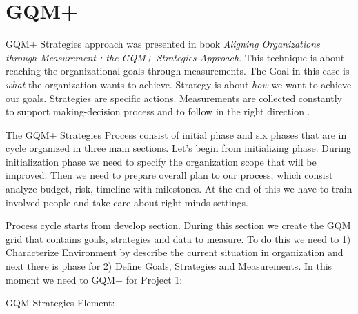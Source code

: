 \section{GQM+}

GQM+ Strategies approach was presented in  book \textit{Aligning Organizations through Measurement : the GQM+ Strategies Approach}. This technique is about reaching the organizational goals through measurements. The Goal in this case is \textit{what} the organization wants to achieve. Strategy is about \textit{how} we want to achieve our goals. Strategies are specific actions. Measurements are collected constantly to support making-decision process and to follow in the right direction \cite{basili}.

The GQM+ Strategies  Process consist of initial phase and six phases that are in cycle organized in three main sections. Let's begin from initializing phase. During initialization phase we need to specify the organization scope that will be improved. Then we need to prepare overall plan to our process, which consist analyze budget, risk, timeline with milestones. At the end of this we have to train involved people and take care about right minds settings.

Process cycle starts from develop section. During this section we create the GQM grid that contains goals, strategies and data to measure. To do this we need to 1) Characterize Environment by describe the current situation in organization and next there is phase for 2) Define Goals, Strategies and Measurements. In this moment we need to  
GQM+ for Project 1:

GQM Strategies Element:

